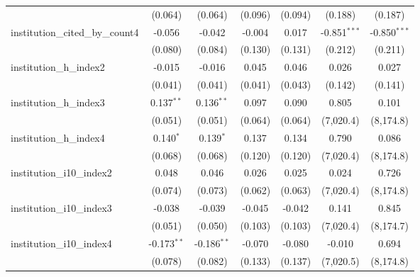 \begin{tabular}{lcccccc}
                                         & (0.064)       & (0.064)       & (0.096)        & (0.094)        & (0.188)        & (0.187)\\   
   institution\_cited\_by\_count4        & -0.056        & -0.042        & -0.004         & 0.017          & -0.851$^{***}$ & -0.850$^{***}$\\   
                                         & (0.080)       & (0.084)       & (0.130)        & (0.131)        & (0.212)        & (0.211)\\   
   institution\_h\_index2                & -0.015        & -0.016        & 0.045          & 0.046          & 0.026          & 0.027\\   
                                         & (0.041)       & (0.041)       & (0.041)        & (0.043)        & (0.142)        & (0.141)\\   
   institution\_h\_index3                & 0.137$^{**}$  & 0.136$^{**}$  & 0.097          & 0.090          & 0.805          & 0.101\\   
                                         & (0.051)       & (0.051)       & (0.064)        & (0.064)        & (7,020.4)      & (8,174.8)\\   
   institution\_h\_index4                & 0.140$^{*}$   & 0.139$^{*}$   & 0.137          & 0.134          & 0.790          & 0.086\\   
                                         & (0.068)       & (0.068)       & (0.120)        & (0.120)        & (7,020.4)      & (8,174.8)\\   
   institution\_i10\_index2              & 0.048         & 0.046         & 0.026          & 0.025          & 0.024          & 0.726\\   
                                         & (0.074)       & (0.073)       & (0.062)        & (0.063)        & (7,020.4)      & (8,174.8)\\   
   institution\_i10\_index3              & -0.038        & -0.039        & -0.045         & -0.042         & 0.141          & 0.845\\   
                                         & (0.051)       & (0.050)       & (0.103)        & (0.103)        & (7,020.4)      & (8,174.7)\\   
   institution\_i10\_index4              & -0.173$^{**}$ & -0.186$^{**}$ & -0.070         & -0.080         & -0.010         & 0.694\\   
                                         & (0.078)       & (0.082)       & (0.133)        & (0.137)        & (7,020.5)      & (8,174.8)\\   

\end{tabular}
